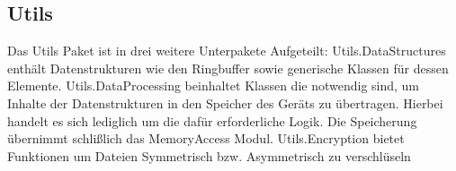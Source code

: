 \label{app:module:utils}\subsection{Utils}
Das Utils Paket ist in drei weitere Unterpakete Aufgeteilt: Utils.DataStructures enthält Datenstrukturen wie den Ringbuffer sowie generische Klassen für dessen  Elemente. Utils.DataProcessing beinhaltet Klassen die notwendig sind, um Inhalte der Datenstrukturen in den Speicher des Geräts zu übertragen. Hierbei handelt es sich lediglich um die dafür erforderliche Logik. Die Speicherung übernimmt schlißlich das MemoryAccess Modul. Utils.Encryption bietet Funktionen um Dateien Symmetrisch bzw. Asymmetrisch zu verschlüseln